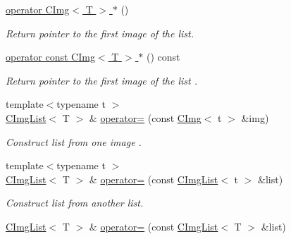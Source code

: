\begin{Indent}
\begin{DoxyCompactItemize}
\hyperlink{structcimg__library__suffixed_1_1CImgList_a9307777e475ee49b57aabbdbf2a24691}{operator C\+Img$<$ T $>$ $\ast$} ()
\begin{DoxyCompactList}\small\item\em Return pointer to the first image of the list. \end{DoxyCompactList}\item 
\mbox{\label{structcimg__library__suffixed_1_1CImgList_a269d829713aeb9b9cacec87a758bc2eb}} 
\hyperlink{structcimg__library__suffixed_1_1CImgList_a269d829713aeb9b9cacec87a758bc2eb}{operator const C\+Img$<$ T $>$ $\ast$} () const
\begin{DoxyCompactList}\small\item\em Return pointer to the first image of the list . \end{DoxyCompactList}\item 
{\footnotesize template$<$typename t $>$ }\\\hyperlink{structcimg__library__suffixed_1_1CImgList}{C\+Img\+List}$<$ T $>$ \& \hyperlink{structcimg__library__suffixed_1_1CImgList_afd4e6df51f7e4f5d30cf3ce638c3d704}{operator=} (const \hyperlink{structcimg__library__suffixed_1_1CImg}{C\+Img}$<$ t $>$ \&img)
\begin{DoxyCompactList}\small\item\em Construct list from one image . \end{DoxyCompactList}\item 
{\footnotesize template$<$typename t $>$ }\\\hyperlink{structcimg__library__suffixed_1_1CImgList}{C\+Img\+List}$<$ T $>$ \& \hyperlink{structcimg__library__suffixed_1_1CImgList_afbb9a219763c398164f16f8d422b22e8}{operator=} (const \hyperlink{structcimg__library__suffixed_1_1CImgList}{C\+Img\+List}$<$ t $>$ \&list)
\begin{DoxyCompactList}\small\item\em Construct list from another list. \end{DoxyCompactList}\item 
\mbox{\label{structcimg__library__suffixed_1_1CImgList_a0a02792d42595faedd419a7be57eea76}} 
\hyperlink{structcimg__library__suffixed_1_1CImgList}{C\+Img\+List}$<$ T $>$ \& \hyperlink{structcimg__library__suffixed_1_1CImgList_a0a02792d42595faedd419a7be57eea76}{operator=} (const \hyperlink{structcimg__library__suffixed_1_1CImgList}{C\+Img\+List}$<$ T $>$ \&list)

\end{DoxyCompactItemize}
\end{Indent}
